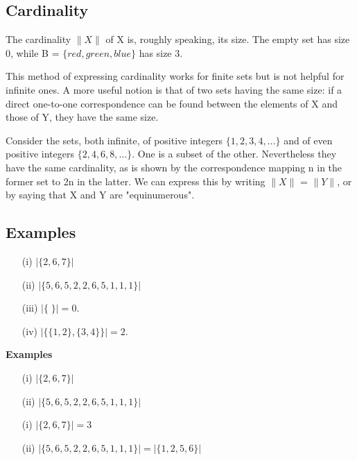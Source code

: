 \subsection{Cardinality}

The cardinality $\|X\|$ of X is, roughly speaking, its size. The empty set has size 0, while B = $\{red, green, blue\}$ has size 3. 

This method of expressing cardinality works for finite sets but is not helpful for infinite ones. A more useful notion is that of two sets having the same size: if a direct one-to-one correspondence can be found between the elements of X and those of Y, they have the same size. 

Consider the sets, both infinite, of positive integers $\{1,2,3,4, \ldots\}$ and of even positive integers $\{2,4,6,8, \ldots\}$. One is a subset of the other. Nevertheless they have the same cardinality, as is shown by the correspondence mapping n in the former set to 2n in the latter. We can express this by writing $\|X\|$ = $\|Y\|$, or by saying that X and Y are "equinumerous".

\subsection{Examples}
\begin{itemize}
\item[(i)] $|\{2,6,7\}|$
\item[(ii)] $|\{5,6,5,2,2,6,5,1,1,1\}|$
\item[(iii)] $|\{ \;\}| = 0$. %
\item[(iv)] $|\{\{1,2\},\{3,4\}\}| = 2$. 
\end{itemize}



\textbf{Examples}
\begin{itemize}
\item[(i)] $|\{2,6,7\}| $

\item[(ii)] $|\{5,6,5,2,2,6,5,1,1,1\}| $

\item[(i)] $|\{2,6,7\}| = 3 $

\item[(ii)] $|\{5,6,5,2,2,6,5,1,1,1\}| = |\{1,2,5,6\}| $
\end{itemize}


